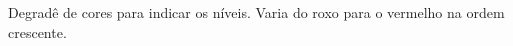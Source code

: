 \begin{frame}[label=funcoes]
\begin{center}
{Degradê de cores para indicar os níveis. Varia do roxo para o vermelho na ordem crescente.
}
\end{center}
\end{frame}




